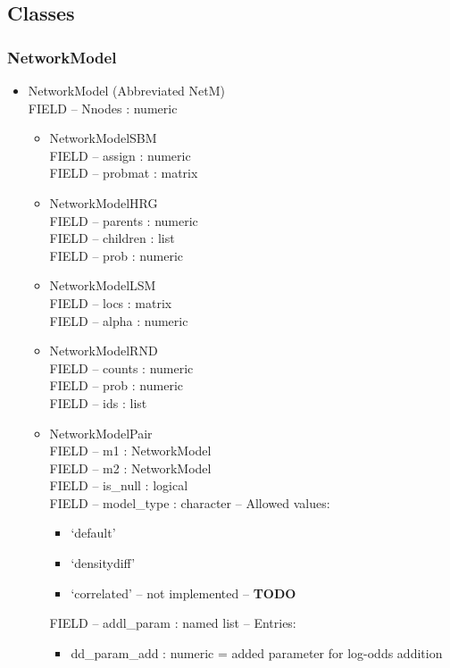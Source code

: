 \documentclass[11pt]{article}
\begin{document}
\subsection{Classes}

\subsubsection{NetworkModel}
\begin{itemize}
\item NetworkModel (Abbreviated NetM)\\
FIELD -- Nnodes : numeric
\begin{itemize}
\item NetworkModelSBM\\
FIELD -- assign : numeric \\
FIELD -- probmat : matrix\\
\item NetworkModelHRG\\
FIELD -- parents : numeric\\
FIELD -- children : list\\
FIELD -- prob : numeric\\
\item NetworkModelLSM\\
FIELD -- locs : matrix\\
FIELD -- alpha : numeric\\
\item NetworkModelRND\\
FIELD -- counts : numeric\\
FIELD -- prob : numeric\\
FIELD -- ids : list\\
\item NetworkModelPair\\
FIELD -- m1 : NetworkModel\\
FIELD -- m2 : NetworkModel\\
FIELD -- is\_null : logical\\
FIELD -- model\_type : character -- Allowed values:
\begin{itemize}
\item `default'
\item `densitydiff'
\item `correlated' -- not implemented -- {\bf TODO}
\end{itemize}
FIELD -- addl\_param : named list -- Entries: 
\begin{itemize}
\item dd\_param\_add : numeric = added parameter for log-odds addition
\end{itemize}
\end{itemize}
\end{itemize}
\end{document}
